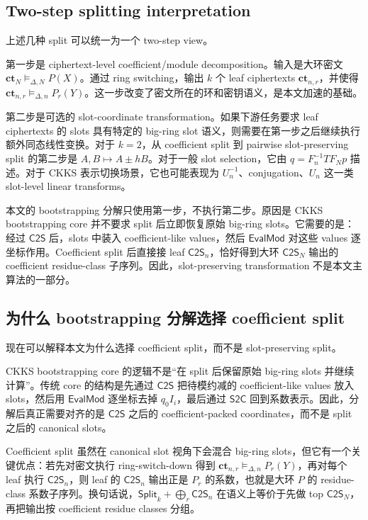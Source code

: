 \documentclass[UTF8,11pt]{article}
\newcommand{\Split}{\mathsf{Split}}
\newcommand{\CtwoS}{\mathsf{C2S}}
\newcommand{\StwoC}{\mathsf{S2C}}
\newcommand{\EvalMod}{\mathsf{EvalMod}}
\newcommand{\ct}{\mathbf{ct}}
\theoremstyle{definition}
\theoremstyle{plain}
\begin{document}
\subsection{Two-step splitting interpretation}
\label{subsec:two-step-splitting}

上述几种 split 可以统一为一个 two-step view。

第一步是 ciphertext-level coefficient/module decomposition。输入是大环密文 \(\ct_N\vDash_{\Delta,N}P(X)\)。通过 ring switching，输出 \(k\) 个 leaf ciphertexts \(\ct_{n,r}\)，并使得 \(\ct_{n,r}\vDash_{\Delta,n}P_r(Y)\)。这一步改变了密文所在的环和密钥语义，是本文加速的基础。

第二步是可选的 slot-coordinate transformation。如果下游任务要求 leaf ciphertexts 的 slots 具有特定的 big-ring slot 语义，则需要在第一步之后继续执行额外同态线性变换。对于 \(k=2\)，从 coefficient split 到 pairwise slot-preserving split 的第二步是 \(A,B\mapsto A\pm hB\)。对于一般 slot selection，它由 \(q=F_n^{-1}TF_Np\) 描述。对于 CKKS 表示切换场景，它也可能表现为 \(U_n^{-1}\)、conjugation、\(U_n\) 这一类 slot-level linear transforms。

本文的 bootstrapping 分解只使用第一步，不执行第二步。原因是 CKKS bootstrapping core 并不要求 split 后立即恢复原始 big-ring slots。它需要的是：经过 \(\CtwoS\) 后，slots 中装入 coefficient-like values，然后 \(\EvalMod\) 对这些 values 逐坐标作用。Coefficient split 后直接接 leaf \(\CtwoS_n\)，恰好得到大环 \(\CtwoS_N\) 输出的 coefficient residue-class 子序列。因此，slot-preserving transformation 不是本文主算法的一部分。

\subsection{为什么 bootstrapping 分解选择 coefficient split}
\label{subsec:why-coeff-split-for-bts}

现在可以解释本文为什么选择 coefficient split，而不是 slot-preserving split。

CKKS bootstrapping core 的逻辑不是“在 split 后保留原始 big-ring slots 并继续计算”。传统 core 的结构是先通过 \(\CtwoS\) 把待模约减的 coefficient-like values 放入 slots，然后用 \(\EvalMod\) 逐坐标去掉 \(q_0I_i\)，最后通过 \(\StwoC\) 回到系数表示。因此，分解后真正需要对齐的是 \(\CtwoS\) 之后的 coefficient-packed coordinates，而不是 split 之后的 canonical slots。

Coefficient split 虽然在 canonical slot 视角下会混合 big-ring slots，但它有一个关键优点：若先对密文执行 ring-switch-down 得到 \(\ct_{n,r}\vDash_{\Delta,n}P_r(Y)\)，再对每个 leaf 执行 \(\CtwoS_n\)，则 leaf 的 \(\CtwoS_n\) 输出正是 \(P_r\) 的系数，也就是大环 \(P\) 的 residue-class 系数子序列。换句话说，\(\Split_k+\bigoplus_r\CtwoS_n\) 在语义上等价于先做 top \(\CtwoS_N\)，再把输出按 coefficient residue classes 分组。
\end{document}
